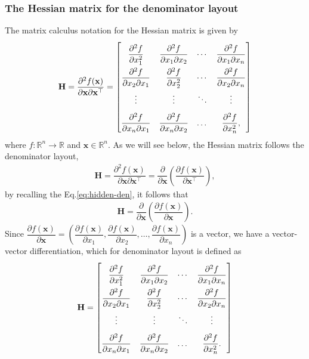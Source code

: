 \documentclass{article}
\begin{document}
\subsubsection{The Hessian matrix for the denominator layout}
The matrix calculus notation for the Hessian matrix is given by
\begin{align}
    \label{eq:hessian-eq}
    \mathbf{H} = \dfrac{\partial^{2} f(\mathbf{x})}{\partial \mathbf{x} \partial \mathbf{x}^\top} = \renewcommand{\arraystretch}{2.2}\begin{bmatrix}
        \dfrac{\partial^{2} f}{\partial x_1^2} & \dfrac{\partial^{2} f}{\partial x_1 \partial x_2} & \cdots & \dfrac{\partial^{2} f}{\partial x_1 \partial x_n} \\
        \dfrac{\partial^{2} f}{\partial x_2 \partial x_1} & \dfrac{\partial^{2} f}{\partial x_2^2} & \cdots & \dfrac{\partial^{2} f}{\partial x_2 \partial x_n} \\
        \vdots & \vdots & \ddots & \vdots \\
        \dfrac{\partial^{2} f}{\partial x_n \partial x_1} & \dfrac{\partial^{2} f}{\partial x_n \partial x_2} & \dots & \dfrac{\partial^{2} f}{\partial x_n^2},
    \end{bmatrix}
\end{align}
where \(f: \mathbb{R}^{n} \rightarrow \mathbb{R}\) and \(\mathbf{x} \in \mathbb{R}^{n}\). As we will see below, the Hessian matrix follows the denominator layout,
\begin{align}
    \mathbf{H} = \dfrac{\partial^{2} f(\mathbf{x})}{\partial \mathbf{x} \partial \mathbf{x}^\top} = \dfrac{\partial }{\partial \mathbf{x}}\left( \dfrac{\partial f(\mathbf{x})}{\partial \mathbf{x}^\top} \right),
\end{align}
by recalling the Eq.\eqref{eq:hidden-den}, it follows that
\begin{align}
    \mathbf{H} = \dfrac{\partial }{\partial \mathbf{x}}\left( \dfrac{\partial f(\mathbf{x})}{\partial \mathbf{x}} \right).
\end{align}
Since \(\dfrac{\partial f(\mathbf{x})}{\partial \mathbf{x}} = \left( \dfrac{\partial f(\mathbf{x})}{\partial x_1}, \dfrac{\partial f(\mathbf{x})}{\partial x_2}, \dots, \dfrac{\partial f(\mathbf{x})}{\partial x_n} \right)\) is a vector, we have a vector-vector differentiation, which for denominator layout is defined as
\begin{align}
    \mathbf{H} = \renewcommand{\arraystretch}{2.2}\begin{bmatrix}
        \dfrac{\partial^{2} f}{\partial x_1^2} & \dfrac{\partial^{2} f}{\partial x_1 \partial x_2} & \cdots & \dfrac{\partial^{2} f}{\partial x_1 \partial x_n} \\
        \dfrac{\partial^{2} f}{\partial x_2 \partial x_1} & \dfrac{\partial^{2} f}{\partial x_2^2} & \cdots & \dfrac{\partial^{2} f}{\partial x_2 \partial x_n} \\
        \vdots & \vdots & \ddots & \vdots \\
        \dfrac{\partial^{2} f}{\partial x_n \partial x_1} & \dfrac{\partial^{2} f}{\partial x_n \partial x_2} & \dots & \dfrac{\partial^{2} f}{\partial x_n^2}.
    \end{bmatrix}
\end{align}
\end{document}
